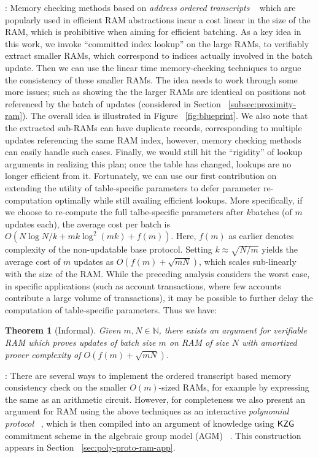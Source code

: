 \documentclass[sigconf]{acmart}
\newtheorem{theorem}{Theorem}[section]
\begin{document}
:
Memory checking methods based on {\em address ordered transcripts}
~\cite{NDSS:WSRBW15,USENIX:BCTV14,C:BCGTV13,SP:ZGKPP18} which are popularly used in
efficient RAM abstractions incur a cost linear in the size of the RAM, which is prohibitive when
aiming for efficient batching. As a key idea in this work, we invoke ``committed index lookup'' on
the large RAMs, to verifiably extract smaller RAMs, which correspond to indices actually involved in
the batch update. Then we can use the linear time memory-checking techniques to argue the consistency of these
smaller RAMs. The idea needs to work through some more issues; such as showing the the larger RAMs are identical
on positions not referenced by the batch of updates (considered in Section ~\ref{subsec:proximity-ram}).
The overall idea is illustrated in Figure ~\ref{fig:blueprint}. We also note that the extracted sub-RAMs can
have duplicate records, corresponding to multiple updates referencing the same RAM index, however, memory
checking methods can easily handle such cases. Finally, we would still hit the ``rigidity'' of lookup arguments
in realizing this plan; once the table has changed, lookups are no longer efficient from it. Fortunately,
we can use our first contribution on extending the utility of table-specific parameters to defer parameter
re-computation optimally while still availing efficient lookups. More specifically, if we choose to
re-compute the full talbe-specific parameters after $k$batches (of $m$ updates each),
the average cost per batch is $O(N\log N/k + mk\log^2(mk) + f(m))$. Here, $f(m)$ as earlier denotes complexity
of the non-updatable base protocol. Setting $k\approx \sqrt{N/m}$ yields the average cost of $m$ updates as $O(f(m)+\sqrt{mN})$,
which scales sub-linearly with the size of the RAM.
While the preceding analysis considers the worst case,
in specific applications (such as account transactions, where few accounts contribute a large volume of transactions), it may be
possible to further delay the computation of table-specific parameters.
Thus we have:
\begin{theorem}[Informal]\label{thm:inc-ver-ram-informal}
Given $m,N\in \mathbb{N}$, there exists an argument for verifiable RAM which proves updates of batch size $m$ on RAM of size $N$
with amortized prover complexity of $O(f(m) + \sqrt{mN})$.
\end{theorem}


: There are several ways to implement the ordered transcript based
memory consistency check on the smaller $O(m)$-sized RAMs, for example by expressing the same as an arithmetic
circuit. However, for completeness we also present an argument for RAM using the above techniques as an
interactive {\em polynomial protocol} ~\cite{Gabizon2019PLONKPO}, which is then compiled into an argument of knowledge using $\mathsf{KZG}$ ~\cite{AC:KatZavGol10}
commitment scheme in the algebraic group model (AGM) ~\cite{C:FucKilLos18}. This construction appears in
Section ~\ref{sec:poly-proto-ram-app}.
\end{document}

